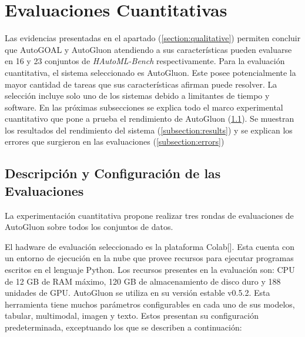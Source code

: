 \section{Evaluaciones Cuantitativas}\label{section:quantitative}

Las evidencias presentadas en el apartado (\ref{section:qualitative}) permiten concluir que AutoGOAL y AutoGluon atendiendo a sus características pueden 
evaluarse en 16 y 23 conjuntos de \textit{HAutoML-Bench} respectivamente.
Para la evaluación cuantitativa, el sistema seleccionado es AutoGluon. Este posee potencialmente la mayor cantidad de tareas que sus características afirman 
puede resolver. 
La selección incluye solo uno de los sistemas debido a limitantes de tiempo y software. 
En las próximas subsecciones se explica todo el marco experimental cuantitativo que pone a prueba el rendimiento de AutoGluon (\ref{subsection:seetings}). Se muestran 
los resultados del rendimiento del sistema (\ref{subsection:results}) y se explican los errores que surgieron en las evaluaciones (\ref{subsection:errors})

\subsection{Descripción y Configuración de las Evaluaciones}\label{subsection:seetings}

La experimentación cuantitativa propone realizar tres rondas de evaluaciones de AutoGluon sobre todos los conjuntos de datos.

El hadware de evaluación seleccionado es la plataforma Colab[\cite{colab}]. Esta cuenta con un entorno de ejecución en la nube que provee recursos para ejecutar programas 
escritos en el lenguaje Python. Los recursos presentes en la evaluación son: CPU de 12 GB de RAM máximo, 120 GB de almacenamiento de disco duro y 188 unidades de GPU.
AutoGluon se utiliza en su versión estable v0.5.2. Esta herramienta tiene muchos parámetros configurables en cada uno de sus modelos, tabular, multimodal, imagen y texto. 
Estos presentan su configuración predeterminada, exceptuando los que se describen a continuación:


